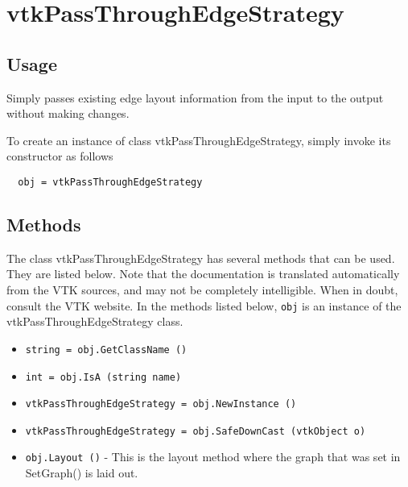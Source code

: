 \section{vtkPassThroughEdgeStrategy}

\subsection{Usage}

 Simply passes existing edge layout information from the input to the
 output without making changes.

To create an instance of class vtkPassThroughEdgeStrategy, simply
invoke its constructor as follows
\begin{verbatim}
  obj = vtkPassThroughEdgeStrategy
\end{verbatim}
\subsection{Methods}

The class vtkPassThroughEdgeStrategy has several methods that can be used.
  They are listed below.
Note that the documentation is translated automatically from the VTK sources,
and may not be completely intelligible.  When in doubt, consult the VTK website.
In the methods listed below, \verb|obj| is an instance of the vtkPassThroughEdgeStrategy class.
\begin{itemize}
\item  \verb|string = obj.GetClassName ()|

\item  \verb|int = obj.IsA (string name)|

\item  \verb|vtkPassThroughEdgeStrategy = obj.NewInstance ()|

\item  \verb|vtkPassThroughEdgeStrategy = obj.SafeDownCast (vtkObject o)|

\item  \verb|obj.Layout ()| -  This is the layout method where the graph that was
 set in SetGraph() is laid out.

\end{itemize}
